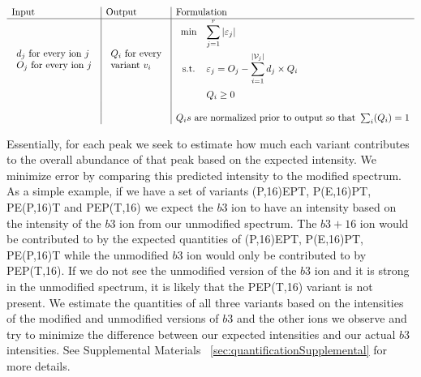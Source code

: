 \documentclass[11pt]{article}
\begin{document}
{\[
\begin{array}{l|l|l}
{\rm Input} & {\rm Output} & {\rm Formulation} \\
\hline
\begin{array}{l}
d_j \mbox{ for every ion } j \\
O_j \mbox{ for every ion } j \\
\end{array}&
\begin{array}{l} Q_i \mbox{ for every}\\
\mbox{variant } v_i \\
\end{array}&
\begin{array}{cll}
\min &{\displaystyle \sum_{j=1}^{r}{|\varepsilon_j|}}\\[1.5em]
{\rm s.t.}&{\displaystyle \varepsilon_j = O_j - \sum_{i=1}^{|\mathcal{V}_j|} d_j \times{Q_i} }\\
[1.5em]
&{\displaystyle Q_i\geq 0} \\
\end{array}\\
&&\\
&&Q_is\mbox{ are normalized prior to output so that } \sum_i(Q_i) = 1\\
\end{array}\\
\]

Essentially, for each peak we seek to estimate how much each variant contributes to the overall abundance
of that peak based on the expected intensity. We minimize error by comparing this predicted intensity to the modified spectrum. As a simple example, if we have a set of variants (P,16)EPT, P(E,16)PT, PE(P,16)T and PEP(T,16) we expect the $b3$ ion to have an intensity based on the intensity of the $b3$ ion from our unmodified spectrum. The $b3+16$ ion would be contributed to by the expected quantities of (P,16)EPT, P(E,16)PT, PE(P,16)T while the unmodified $b3$ ion would only be contributed to by PEP(T,16). If we do not see the unmodified version of the $b3$ ion and it is strong in the unmodified spectrum, it is likely that the PEP(T,16) variant is not present. We estimate the quantities of all three variants based on the intensities of the modified and unmodified versions of $b3$ and the other ions we observe and try to minimize the difference between our expected intensities and our actual $b3$ intensities. See Supplemental Materials ~\ref{sec:quantificationSupplemental} for more details.

}
\end{document}
